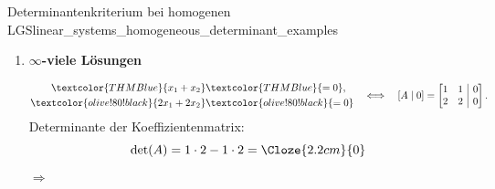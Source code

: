 \begin{ExampleBox}{Determinantenkriterium bei homogenen LGS}{linear_systems_homogeneous_determinant_examples}
\begin{enumerate}[label=\alph*),leftmargin=1.8em,itemsep=1.5em]
    \item
      \textbf{$\infty$-viele Lösungen}\par
      \noindent
      \begin{minipage}[c]{0.61\linewidth}
        \vspace{-0.45\baselineskip}
        \[
          \begin{aligned}
            \textcolor{THMBlue}{x_1+x_2}&\textcolor{THMBlue}{=0},\\
            \textcolor{olive!80!black}{2x_1+2x_2}&\textcolor{olive!80!black}{=0}
          \end{aligned}
          \quad\Longleftrightarrow\quad
          [A\mid 0]=
          \left[
            \begin{array}{@{}rr|r@{}}
              1&1&0\\
              2&2&0
            \end{array}
          \right].
        \]
        \noindent
        Determinante der Koeffizientenmatrix:
        \[
          \det(A)=1\cdot2-1\cdot2
          =\Cloze{2.2cm}{0}
        \]
        \noindent
        $\Longrightarrow$\quad
      \end{minipage}\hfill
      \begin{minipage}[c]{0.34\linewidth}
        \centering
      \end{minipage}
  \end{enumerate}
\end{ExampleBox}
